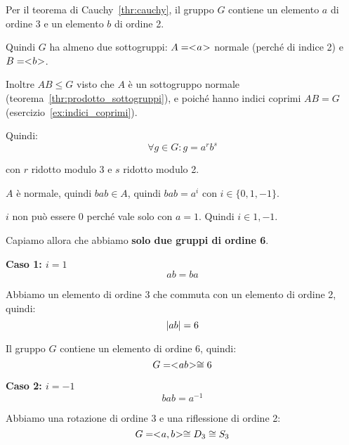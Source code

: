 \begin{soluzione}
    Per il teorema di Cauchy~\ref{thr:cauchy}, il gruppo $G$ contiene un elemento $a$ di ordine 3 e un elemento $b$ di
    ordine 2.

    Quindi $G$ ha almeno due sottogruppi: $A = < \negmedspace a \negmedspace >$ normale (perché di indice 2) e $B = < \negmedspace b \negmedspace >$.

    Inoltre $AB \le G$ visto che $A$ è un sottogruppo normale (teorema~\ref{thr:prodotto_sottogruppi}), e poiché
    hanno indici coprimi $AB = G$ (esercizio~\ref{ex:indici_coprimi}).

    Quindi:
    \begin{equation*}
        \forall g \in G : g = a^r b^s
    \end{equation*}

    con $r$ ridotto modulo 3 e $s$ ridotto modulo 2.

    $A$ è normale, quindi $b a b \in A$, quindi $b a b = a^i$ con $i \in \{0,1,-1\}$.

    $i$ non può essere 0 perché vale solo con $a = 1$.
    Quindi $i \in {1, -1}$.

    Capiamo allora che abbiamo \textbf{solo due gruppi di ordine 6}.

    \textbf{Caso 1: $i = 1$}
    \begin{equation*}
        ab = ba
    \end{equation*}

    Abbiamo un elemento di ordine 3 che commuta con un elemento di ordine 2, quindi:
    \begin{equation*}
        \lvert ab \rvert = 6
    \end{equation*}

    Il gruppo $G$ contiene un elemento di ordine 6, quindi:
    \begin{equation*}
        G = < \negmedspace ab \negmedspace > \cong 6
    \end{equation*}

    \textbf{Caso 2: $i = -1$}
    \begin{equation*}
        bab = a^{-1}
    \end{equation*}

    Abbiamo una rotazione di ordine 3 e una riflessione di ordine 2:
    \begin{equation*}
        G = < \negmedspace a, b \negmedspace > \cong D_3 \cong S_3
    \end{equation*}

\end{soluzione}